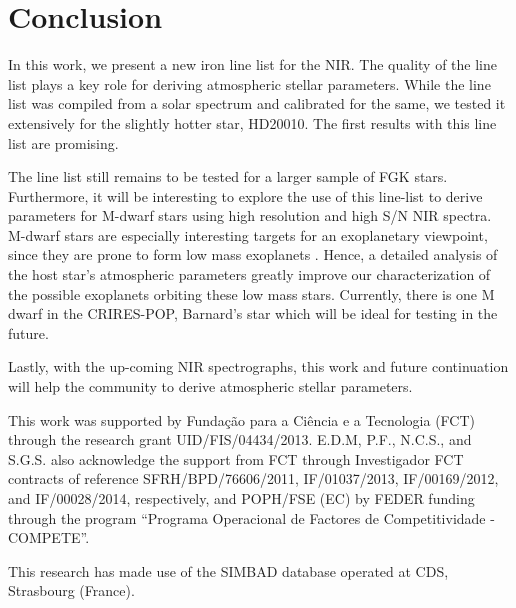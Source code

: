 \documentclass{aa}
\begin{document}
\section{Conclusion}
In this work, we present a new iron line list for the NIR. The quality
of the line list plays a key role for deriving atmospheric stellar
parameters. While the line list was compiled from a solar spectrum
and calibrated for the same, we tested it extensively for the slightly
hotter star, HD20010. The first results with this line list are promising.

The line list still remains to be tested for a larger sample of FGK
stars. Furthermore, it will be interesting to explore the use of this
line-list to derive parameters for M-dwarf stars using high resolution
and high S/N NIR spectra. M-dwarf stars are especially interesting
targets for an exoplanetary viewpoint, since they are prone to form low
mass exoplanets \cite{Bonfils2013}. Hence, a detailed analysis of the
host star's atmospheric parameters greatly improve our characterization
of the possible exoplanets orbiting these low mass stars. Currently,
there is one M dwarf in the CRIRES-POP, Barnard's star which will be
ideal for testing in the future.

Lastly, with the up-coming NIR spectrographs, this work and future
continuation will help the community to derive atmospheric stellar
parameters.





\begin{acknowledgements}

This work was supported by Funda\c{c}\~ao para a Ci\^encia e a
Tecnologia (FCT) through the research grant UID/FIS/04434/2013.
E.D.M, P.F., N.C.S., and S.G.S. also acknowledge the support from FCT
through Investigador FCT contracts of reference SFRH/BPD/76606/2011,
IF/01037/2013, IF/00169/2012, and IF/00028/2014, respectively, and
POPH/FSE (EC) by FEDER funding through the program “Programa
Operacional de Factores de Competitividade - COMPETE”.

This research has made use of the SIMBAD database operated at CDS,
Strasbourg (France).

\end{acknowledgements}








\end{document}
